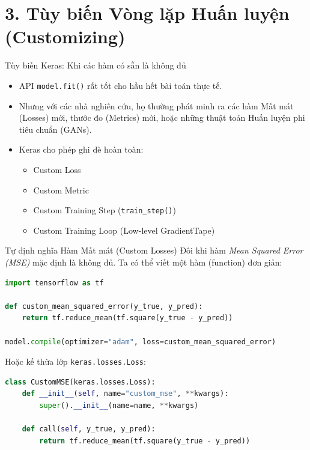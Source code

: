 \documentclass[aspectratio=169]{beamer}
\begin{document}
\section{3. Tùy biến Vòng lặp Huấn luyện (Customizing)}

\begin{frame}{Tùy biến Keras: Khi các hàm có sẵn là không đủ}
    \begin{itemize}
        \item API \texttt{model.fit()} rất tốt cho hầu hết bài toán thực tế.
        \item Nhưng với các nhà nghiên cứu, họ thường phát minh ra các hàm Mất mát (Losses) mới, thước đo (Metrics) mới, hoặc những thuật toán Huấn luyện phi tiêu chuẩn (GANs).
        \item Keras cho phép ghi đè hoàn toàn:
        \begin{itemize}
            \item Custom Loss
            \item Custom Metric
            \item Custom Training Step (\texttt{train\_step()})
            \item Custom Training Loop (Low-level GradientTape)
        \end{itemize}
    \end{itemize}
\end{frame}

\begin{frame}[fragile]{Tự định nghĩa Hàm Mất mát (Custom Losses)}
Đôi khi hàm \textit{Mean Squared Error (MSE)} mặc định là không đủ. Ta có thể viết một hàm (function) đơn giản:
\begin{lstlisting}[language=Python]
import tensorflow as tf

def custom_mean_squared_error(y_true, y_pred):
    return tf.reduce_mean(tf.square(y_true - y_pred))

model.compile(optimizer="adam", loss=custom_mean_squared_error)
\end{lstlisting}

Hoặc kế thừa lớp \texttt{keras.losses.Loss}:
\begin{lstlisting}[language=Python]
class CustomMSE(keras.losses.Loss):
    def __init__(self, name="custom_mse", **kwargs):
        super().__init__(name=name, **kwargs)

    def call(self, y_true, y_pred):
        return tf.reduce_mean(tf.square(y_true - y_pred))
\end{lstlisting}
\end{frame}
\end{document}
